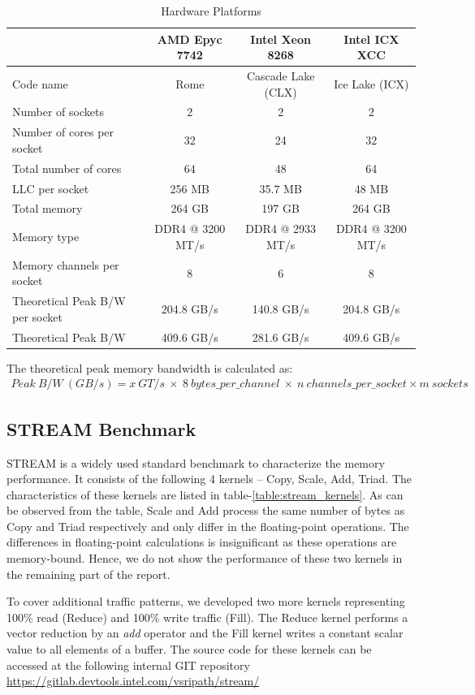 \documentclass{article}
\begin{document}
\begin{table}[h!]
\centering
 \begin{tabular}{|l|c|c|c|} \hline
& AMD Epyc 7742 & Intel Xeon 8268 & Intel ICX XCC \\\hline
Code name & Rome & Cascade Lake (CLX) & Ice Lake (ICX) \\ \hline
Number of sockets & 2 & 2 & 2 \\ \hline
Number of cores per socket & 32 & 24 & 32 \\ \hline
Total number of cores & 64 & 48 & 64 \\ \hline
LLC per socket & 256 MB & 35.7 MB & 48 MB \\ \hline
Total memory & 264 GB & 197 GB & 264 GB \\ \hline
Memory type & DDR4 @ 3200 MT/s & DDR4 @ 2933 MT/s & DDR4 @ 3200 MT/s \\ \hline
Memory channels per socket & 8 & 6 & 8 \\ \hline
Theoretical Peak B/W per socket & 204.8 GB/s & 140.8 GB/s & 204.8 GB/s\\   \hline
Theoretical Peak B/W & 409.6 GB/s & 281.6 GB/s & 409.6 GB/s\\   \hline
\end{tabular}
\caption{Hardware Platforms}
\label{table:hw_platforms}
\end{table}

The theoretical peak memory bandwidth is calculated as: 
\begin{align*}
 Peak\: B/W\: (GB/s) = x\: GT/s\: \times\: 8 \:bytes\_per\_channel\: \times\:  n\: channels\_per\_socket \times m\: sockets
\end{align*}

\subsection{STREAM Benchmark}
STREAM is a widely used standard benchmark to characterize the memory performance. It consists of the following 4 kernels -- Copy, Scale, Add, Triad. The characteristics of these kernels are listed in table-\ref{table:stream_kernels}. As can be observed from the table, Scale and Add process the same number of bytes as Copy and Triad respectively and only differ in the floating-point operations. The differences in floating-point calculations is insignificant as these operations are memory-bound. Hence, we do not show the performance of these two kernels in the remaining part of the report.

To cover additional traffic patterns, we developed two more kernels representing 100\% read (Reduce) and 100\% write traffic (Fill). The Reduce kernel performs a vector reduction by an \textit{add} operator and the Fill kernel writes a constant scalar value to all elements of a buffer. The source code for these kernels can be accessed at the following internal GIT repository \url{https://gitlab.devtools.intel.com/vsripath/stream/}
\end{document}
